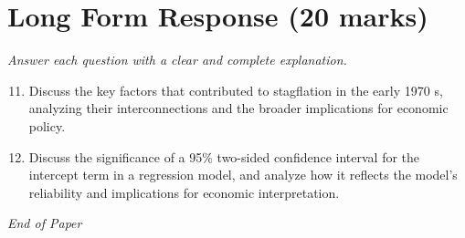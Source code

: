 \documentclass[12pt]{article}
\begin{document}
\section*{Long Form Response (20 marks)}
\textit{Answer each question with a clear and complete explanation.}
\begin{enumerate}[label=\arabic*.]
\setcounter{enumi}{10}
\item Discuss the key factors that contributed to stagflation in the early 1970 s, analyzing their interconnections and the broader implications for economic policy.
\item Discuss the significance of a 95\% two-sided confidence interval for the intercept term in a regression model, and analyze how it reflects the model's reliability and implications for economic interpretation.
\end{enumerate}

\vfill
\noindent\textit{End of Paper}
\end{document}
